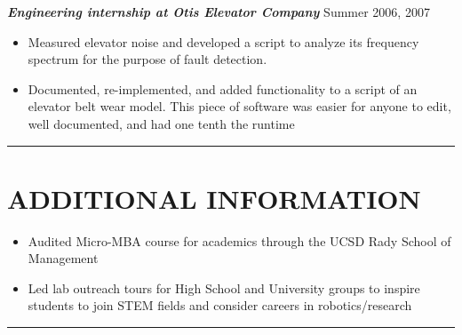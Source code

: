 \documentclass{res}
\begin{document}
\begin{resume}
\vspace*{-2ex}
 {\sl \bf Engineering internship at Otis Elevator Company} \hfill Summer 2006, 2007 
\begin{itemize}
\item Measured elevator noise and developed a script to analyze its frequency spectrum for the purpose of fault detection. 
\item Documented, re-implemented, and added functionality to a script of an elevator belt wear model.  This piece of software was easier for anyone to edit, well documented, and had one tenth the runtime
\end{itemize}
%
 \vspace*{-3ex}
\hspace{-8.5ex}\rule{16.5cm}{0.4pt}
 \vspace*{-3ex}
\section{ADDITIONAL INFORMATION}
\begin{itemize}
\item Audited Micro-MBA course for academics through the UCSD Rady School of Management
\item Led lab outreach tours for High School and University groups to inspire students to join STEM fields and consider careers in robotics/research
\end{itemize}


 \vspace*{-3ex}
\hspace{-8.5ex}\rule{16.5cm}{0.4pt}
 \vspace*{-3ex}

\end{resume}
\end{document}
